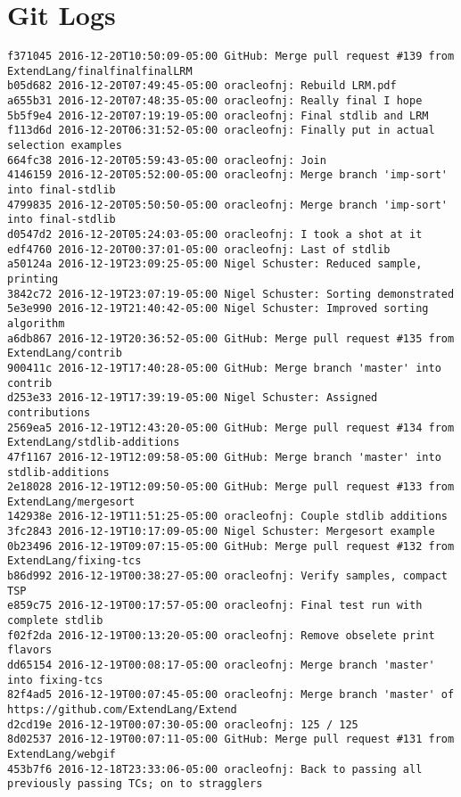 \medskip \noindent
\chapter{Git Logs}
\begin{lstlisting}
f371045 2016-12-20T10:50:09-05:00 GitHub: Merge pull request #139 from ExtendLang/finalfinalfinalLRM
b05d682 2016-12-20T07:49:45-05:00 oracleofnj: Rebuild LRM.pdf
a655b31 2016-12-20T07:48:35-05:00 oracleofnj: Really final I hope
5b5f9e4 2016-12-20T07:19:19-05:00 oracleofnj: Final stdlib and LRM
f113d6d 2016-12-20T06:31:52-05:00 oracleofnj: Finally put in actual selection examples
664fc38 2016-12-20T05:59:43-05:00 oracleofnj: Join
4146159 2016-12-20T05:52:00-05:00 oracleofnj: Merge branch 'imp-sort' into final-stdlib
4799835 2016-12-20T05:50:50-05:00 oracleofnj: Merge branch 'imp-sort' into final-stdlib
d0547d2 2016-12-20T05:24:03-05:00 oracleofnj: I took a shot at it
edf4760 2016-12-20T00:37:01-05:00 oracleofnj: Last of stdlib
a50124a 2016-12-19T23:09:25-05:00 Nigel Schuster: Reduced sample, printing
3842c72 2016-12-19T23:07:19-05:00 Nigel Schuster: Sorting demonstrated
5e3e990 2016-12-19T21:40:42-05:00 Nigel Schuster: Improved sorting algorithm
a6db867 2016-12-19T20:36:52-05:00 GitHub: Merge pull request #135 from ExtendLang/contrib
900411c 2016-12-19T17:40:28-05:00 GitHub: Merge branch 'master' into contrib
d253e33 2016-12-19T17:39:19-05:00 Nigel Schuster: Assigned contributions
2569ea5 2016-12-19T12:43:20-05:00 GitHub: Merge pull request #134 from ExtendLang/stdlib-additions
47f1167 2016-12-19T12:09:58-05:00 GitHub: Merge branch 'master' into stdlib-additions
2e18028 2016-12-19T12:09:50-05:00 GitHub: Merge pull request #133 from ExtendLang/mergesort
142938e 2016-12-19T11:51:25-05:00 oracleofnj: Couple stdlib additions
3fc2843 2016-12-19T10:17:09-05:00 Nigel Schuster: Mergesort example
0b23496 2016-12-19T09:07:15-05:00 GitHub: Merge pull request #132 from ExtendLang/fixing-tcs
b86d992 2016-12-19T00:38:27-05:00 oracleofnj: Verify samples, compact TSP
e859c75 2016-12-19T00:17:57-05:00 oracleofnj: Final test run with complete stdlib
f02f2da 2016-12-19T00:13:20-05:00 oracleofnj: Remove obselete print flavors
dd65154 2016-12-19T00:08:17-05:00 oracleofnj: Merge branch 'master' into fixing-tcs
82f4ad5 2016-12-19T00:07:45-05:00 oracleofnj: Merge branch 'master' of https://github.com/ExtendLang/Extend
d2cd19e 2016-12-19T00:07:30-05:00 oracleofnj: 125 / 125
8d02537 2016-12-19T00:07:11-05:00 GitHub: Merge pull request #131 from ExtendLang/webgif
453b7f6 2016-12-18T23:33:06-05:00 oracleofnj: Back to passing all previously passing TCs; on to stragglers

\end{lstlisting}
